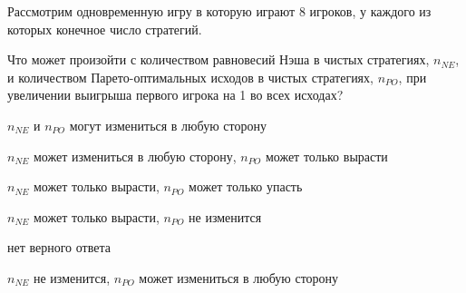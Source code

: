 
\begin{question}
Рассмотрим одновременную игру в которую играют 8 игроков, у каждого из
которых конечное число стратегий.

Что может произойти с количеством равновесий Нэша в чистых стратегиях,
\(n_{NE}\), и количеством Парето-оптимальных исходов в чистых
стратегиях, \(n_{PO}\), при увеличении выигрыша первого игрока на 1 во
всех исходах?
\begin{answerlist}
  \item \(n_{NE}\) и \(n_{PO}\) могут измениться в любую сторону
  \item \(n_{NE}\) может измениться в любую сторону, \(n_{PO}\) может только
вырасти
  \item \(n_{NE}\) может только вырасти, \(n_{PO}\) может только упасть
  \item \(n_{NE}\) может только вырасти, \(n_{PO}\) не изменится
  \item нет верного ответа
  \item \(n_{NE}\) не изменится, \(n_{PO}\) может измениться в любую сторону
\end{answerlist}
\end{question}



